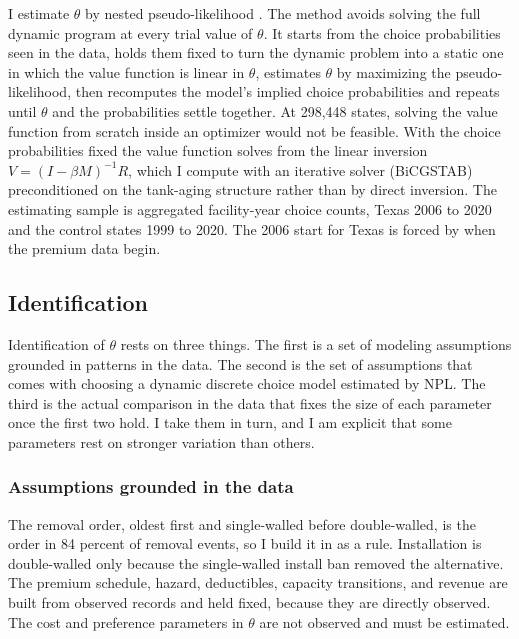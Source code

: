\documentclass[
  12pt,
]{article}
\begin{document}
I estimate \(\theta\) by nested pseudo-likelihood
\citep{aguirregabiria_sequential_2007}. The method avoids solving the
full dynamic program at every trial value of \(\theta\). It starts from
the choice probabilities seen in the data, holds them fixed to turn the
dynamic problem into a static one in which the value function is linear
in \(\theta\), estimates \(\theta\) by maximizing the pseudo-likelihood,
then recomputes the model's implied choice probabilities and repeats
until \(\theta\) and the probabilities settle together. At 298,448
states, solving the value function from scratch inside an optimizer
would not be feasible. With the choice probabilities fixed the value
function solves from the linear inversion \(V=(I-\beta M)^{-1}R\), which
I compute with an iterative solver (BiCGSTAB) preconditioned on the
tank-aging structure rather than by direct inversion. The estimating
sample is aggregated facility-year choice counts, Texas 2006 to 2020 and
the control states 1999 to 2020. The 2006 start for Texas is forced by
when the premium data begin.

\subsection{Identification}\label{identification}

Identification of \(\theta\) rests on three things. The first is a set
of modeling assumptions grounded in patterns in the data. The second is
the set of assumptions that comes with choosing a dynamic discrete
choice model estimated by NPL. The third is the actual comparison in the
data that fixes the size of each parameter once the first two hold. I
take them in turn, and I am explicit that some parameters rest on
stronger variation than others.

\subsubsection{Assumptions grounded in the
data}\label{assumptions-grounded-in-the-data}

The removal order, oldest first and single-walled before double-walled,
is the order in 84 percent of removal events, so I build it in as a
rule. Installation is double-walled only because the single-walled
install ban removed the alternative. The premium schedule, hazard,
deductibles, capacity transitions, and revenue are built from observed
records and held fixed, because they are directly observed. The cost and
preference parameters in \(\theta\) are not observed and must be
estimated.
\end{document}
